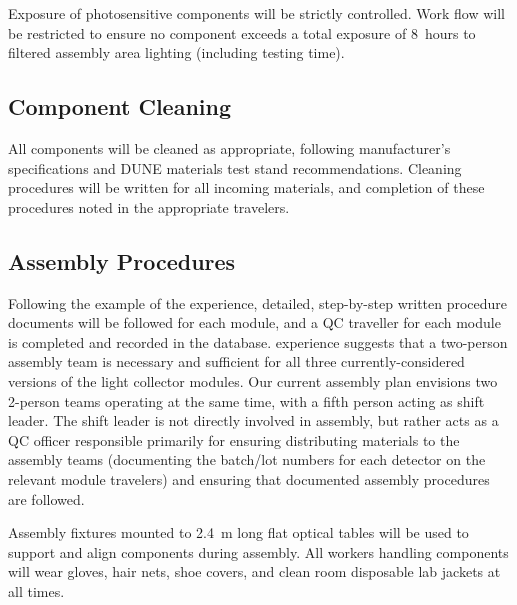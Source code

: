
Exposure of photosensitive components will be strictly controlled.  Work flow will be restricted to ensure no component exceeds a total exposure of \SI{8}{hours} to filtered assembly area lighting (including testing time).

\subsection{Component Cleaning}

All components will be cleaned  as appropriate, following manufacturer's specifications and DUNE materials test stand recommendations.  Cleaning procedures will be written for all incoming materials, and completion of these procedures noted in the appropriate travelers.

\subsection{Assembly Procedures}

Following the example of the  experience, detailed, step-by-step written procedure documents will be followed for each module, and a QC traveller for each module is completed and recorded in the database.   experience suggests that a two-person assembly team is necessary and sufficient for all three currently-considered versions of the light collector modules.  Our current assembly plan envisions two 2-person teams operating at the same time, with a fifth person acting as shift leader.  The shift leader is not directly involved in assembly, but rather acts as a QC officer responsible primarily for ensuring distributing materials to the assembly teams (documenting the batch/lot numbers for each detector on the relevant module travelers) and ensuring that documented assembly procedures are followed.

Assembly fixtures mounted to \SI{2.4}{m} long flat optical tables will be used to support and align  components during assembly.  All workers handling  components will wear gloves, hair nets, shoe covers, and clean room disposable lab jackets at all times.



